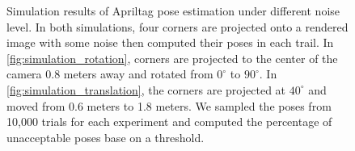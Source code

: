 		
\begin{figure}[h]
\caption{Simulation results of Apriltag pose estimation under different noise level. In both simulations, four corners are projected onto a rendered image with some noise then computed their poses in each trail. In \ref{fig:simulation_rotation}, corners are projected to the center of the camera 0.8 meters away and rotated from $0^{\circ}$ to $90^{\circ}$. In \ref{fig:simulation_translation}, the corners are projected at $40^{\circ}$ and moved from 0.6 meters to 1.8 meters. We sampled the poses from 10,000 trials for each experiment and computed the percentage of unacceptable poses base on a threshold.}
\label{fig:simulation_results}
\end{figure}	
	

